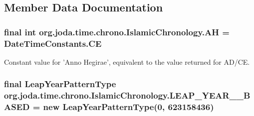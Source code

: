 \subsection{Member Data Documentation}
\hypertarget{classorg_1_1joda_1_1time_1_1chrono_1_1_islamic_chronology_acda6d08a0c9eae8a4c964f6a02d19aea}{
\subsubsection[{A\-H}]{\setlength{\rightskip}{0pt plus 5cm}final int org.\-joda.\-time.\-chrono.\-Islamic\-Chronology.\-A\-H = {\bf Date\-Time\-Constants.\-C\-E}\hspace{0.3cm}{\ttfamily [static]}}}\label{classorg_1_1joda_1_1time_1_1chrono_1_1_islamic_chronology_acda6d08a0c9eae8a4c964f6a02d19aea}
Constant value for 'Anno Hegirae', equivalent to the value returned for A\-D/\-C\-E. \hypertarget{classorg_1_1joda_1_1time_1_1chrono_1_1_islamic_chronology_a47c66f1702f8a935af8c52bb4891edc2}{
\subsubsection[{L\-E\-A\-P\-\_\-\-Y\-E\-A\-R\-\_\-15\-\_\-\-B\-A\-S\-E\-D}]{\setlength{\rightskip}{0pt plus 5cm}final Leap\-Year\-Pattern\-Type org.\-joda.\-time.\-chrono.\-Islamic\-Chronology.\-L\-E\-A\-P\-\_\-\-Y\-E\-A\-R\-\_\-\_\-\-B\-A\-S\-E\-D = new Leap\-Year\-Pattern\-Type(0, 623158436)\hspace{0.3cm}{\ttfamily [static]}}}\label{classorg_1_1joda_1_1time_1_1chrono_1_1_islamic_chronology_a47c66f1702f8a935af8c52bb4891edc2}
